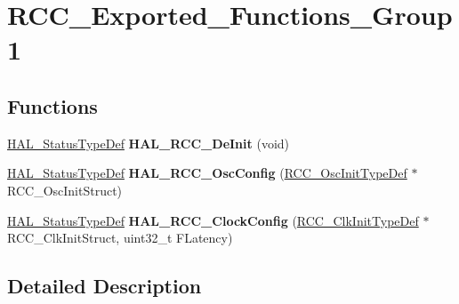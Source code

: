 \hypertarget{group___r_c_c___exported___functions___group1}{}\section{R\+C\+C\+\_\+\+Exported\+\_\+\+Functions\+\_\+\+Group1}
\label{group___r_c_c___exported___functions___group1}
\subsection*{Functions}
\begin{DoxyCompactItemize}
\item 
\mbox{\label{group___r_c_c___exported___functions___group1_ga064f7d9878ecdc1d4852cba2b9e6a52e}} 
\mbox{\hyperlink{stm32f4xx__hal__def_8h_a63c0679d1cb8b8c684fbb0632743478f}{H\+A\+L\+\_\+\+Status\+Type\+Def}} {\bfseries H\+A\+L\+\_\+\+R\+C\+C\+\_\+\+De\+Init} (void)
\item 
\mbox{\label{group___r_c_c___exported___functions___group1_ga9c504088722e03830df6caad932ad06b}} 
\mbox{\hyperlink{stm32f4xx__hal__def_8h_a63c0679d1cb8b8c684fbb0632743478f}{H\+A\+L\+\_\+\+Status\+Type\+Def}} {\bfseries H\+A\+L\+\_\+\+R\+C\+C\+\_\+\+Osc\+Config} (\mbox{\hyperlink{struct_r_c_c___osc_init_type_def}{R\+C\+C\+\_\+\+Osc\+Init\+Type\+Def}} $\ast$R\+C\+C\+\_\+\+Osc\+Init\+Struct)
\item 
\mbox{\label{group___r_c_c___exported___functions___group1_gad0a4b5c7459219fafc15f3f867563ef3}} 
\mbox{\hyperlink{stm32f4xx__hal__def_8h_a63c0679d1cb8b8c684fbb0632743478f}{H\+A\+L\+\_\+\+Status\+Type\+Def}} {\bfseries H\+A\+L\+\_\+\+R\+C\+C\+\_\+\+Clock\+Config} (\mbox{\hyperlink{struct_r_c_c___clk_init_type_def}{R\+C\+C\+\_\+\+Clk\+Init\+Type\+Def}} $\ast$R\+C\+C\+\_\+\+Clk\+Init\+Struct, uint32\+\_\+t F\+Latency)
\end{DoxyCompactItemize}


\subsection{Detailed Description}
